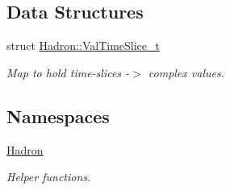 \subsection*{Data Structures}
\begin{DoxyCompactItemize}
\item 
struct \mbox{\hyperlink{structHadron_1_1ValTimeSlice__t}{Hadron\+::\+Val\+Time\+Slice\+\_\+t}}
\begin{DoxyCompactList}\small\item\em Map to hold time-\/slices -\/$>$ complex values. \end{DoxyCompactList}\end{DoxyCompactItemize}
\subsection*{Namespaces}
\begin{DoxyCompactItemize}
\item 
 \mbox{\hyperlink{namespaceHadron}{Hadron}}
\begin{DoxyCompactList}\small\item\em Helper functions. \end{DoxyCompactList}\end{DoxyCompactItemize}

